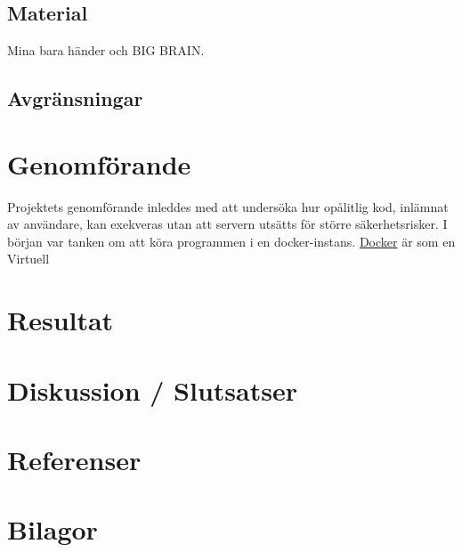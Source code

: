 \documentclass{article}
\begin{document}
\subsection{Material}

Mina bara händer och BIG BRAIN.

\subsection{Avgränsningar}

\section{Genomförande}

Projektets genomförande inleddes med att undersöka hur opålitlig kod, inlämnat
av användare, kan exekveras utan att servern utsätts för större säkerhetsrisker.
I början var tanken om att köra programmen i en docker-instans.
\href{https://www.docker.com}{Docker} är som en Virtuell

\section{Resultat}

\section{Diskussion / Slutsatser}

\section{Referenser}

\section{Bilagor}
\end{document}
